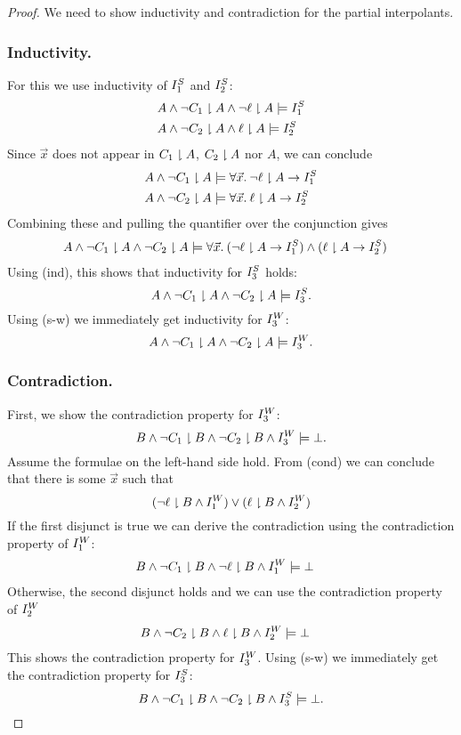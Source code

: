 \begin{techreport}
  \begin{proof}
    We need to show inductivity and contradiction for the partial interpolants.
    \subsubsection*{Inductivity.}
    For this we use inductivity of $I_1\S$ and $I_2\S$:
    \begin{align*}
      & A \land \lnot C_1 \proj A \land \lnot \ell\proj A \models I_1\S \\
      & A \land \lnot C_2 \proj A \land \ell\proj A \models I_2\S
    \end{align*}
    Since $\vec x$ does not appear in $C_1\proj A$, $C_2 \proj A$ nor $A$,
    we can conclude
    \begin{align*}
      & A \land \lnot C_1 \proj A \models \forall \vec x.\: \lnot \ell\proj A \rightarrow I_1\S \\
      & A \land \lnot C_2 \proj A \models \forall \vec x.\: \ell\proj A \rightarrow I_2\S
    \end{align*}
    Combining these and pulling the quantifier over the conjunction gives
    \begin{align*}
      & A \land \lnot C_1 \proj A \land \lnot C_2 \proj A 
       \models \forall \vec x.\: (\lnot \ell\proj A \rightarrow I_1\S) \land
                                (\ell\proj A \rightarrow I_2\S)
    \end{align*}
    Using (ind), this shows that inductivity for  $I_3\S$ holds:
    \[A \land \lnot C_1\proj A \land \lnot C_2\proj A \models I_3\S.\]
    \ifnewinterpolation\else
%
    Using (s-w) we immediately get inductivity for $I_3\W$:
    \[A \land \lnot C_1\proj A \land \lnot C_2\proj A \models I_3\W.\]
    \fi

    \subsubsection*{Contradiction.}
    First, we show the contradiction property for $I_3\W$:
    \[B \land \lnot C_1 \proj B \land \lnot C_2 \proj B \land I_3\W \models \bot.\]
    Assume the formulae on the left-hand side hold.  From (cond) we can conclude that there is some $\vec x$ such that 
    \[(\lnot \ell \proj B \land I_1\W)  \lor
      (\ell \proj B \land I_2\W)\]
    If the first disjunct is true we can derive the contradiction
    using the contradiction property of $I_1\W$:
    \begin{align*}
      & B \land \lnot C_1 \proj B \land \lnot \ell\proj B \land I_1\W \models \bot 
    \end{align*}  
    Otherwise, the second disjunct holds and we can use the contradiction
    property of $I_2\W$
    \begin{align*}
      & B \land \lnot C_2 \proj B \land \ell\proj B  \land I_2\W \models \bot
    \end{align*}  
%
    This shows the contradiction property for $I_3\W$.
    \ifnewinterpolation\else
    Using (s-w) we immediately get the contradiction property for $I_3\S$: 
    \[B \land \lnot C_1 \proj B \land \lnot C_2 \proj B \land I_3\S \models
    \bot.\]


\end{proof}
\end{techreport}
